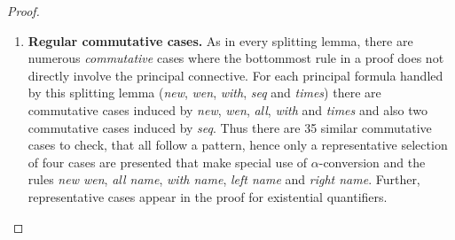 \begin{proof}
\begin{enumerate}[label=\textbf{\Alph*},ref=\Alph*,leftmargin=*]
{Consider the first commutative case for \textit{new} induced by equivariance, where the bottommost rule is of the form
$
\infer[]{
\new x. \new y. P \cpar \wen y. Q \cpar R
}{
\mathopen{\new y.} \left( \new x. P \cpar Q\right) \cpar R
}
$,
where $\vdash \mathopen{\new y.} \left( \new x. P \cpar Q\right) \cpar R$.
By the induction hypothesis, there exist $S$ and $T$ such that $\nfv{y}{S}$ and $\vdash \wen x. P \cpar Q \cpar T$ and either $S = T$ or $S = \wen y .T$, where
$\infer[]{R}{S}$.
Furthermore, the size of the proof of $\wen x. P \cpar Q \cpar T$ is bound above by the size of the proof of $\mathopen{\new y.} \left( \new x. P \cpar Q\right) \cpar R$, hence strictly bound above by the size of the proof of $\new x. \new y. P \cpar \wen y. Q \cpar R$.
Hence, by induction again, there exist $U$ and $V$ such that $\nfv{x}{U}$ and $\vdash P \cpar V$ and either $U = V$ or $U = \wen x. V$, and also $\infer[]{Q \cpar T}{U}$.
If $U = V$ then let $W = \wen y. V$, and if $U = \wen x. V$ then let $W = \wen x. \wen y. V$. 
Also, regardless of whether $S = T$ or $S = \wen y. T$, $\infer[]{\wen y. Q \cpar S}{\mathopen{\wen y.} \left( Q \cpar S \right)}$. Hence derivation $
\infer[]{
\wen y. Q \cpar R
}{
\infer[]{
\wen y. Q \cpar S
}{
\infer[]{
\mathopen{\wen y.} \left( Q \cpar T \right)
}{
\wen y. U
}}}$ can be constructed, where the premise is equivalent to $W$.
Furthermore, $
\infer[]{
\new y. P \cpar \wen y. V
}{
\infer[]{
\mathopen{\new y.} \left( P \cpar V \right)
}{
\infer[]{
\new y. \cunit 
}{ \cunit
}}}$,
and $\size{ \new y. P \cpar \wen y. V } \prec \size{ \new x. \new y. P \cpar \wen y. Q \cpar R }$,
since by Lemma~\ref{lemma:bound} $\size{ \wen y. V } \preceq \size{ \wen y. Q \cpar R }$.

}




 


\item \textbf{Regular commutative cases.} As in every splitting lemma, there are numerous \textit{commutative} cases where the bottommost rule in a proof does not directly involve the principal connective.
For each principal formula handled by this splitting lemma (\textit{new}, \textit{wen}, \textit{with}, \textit{seq} and \textit{times}) there are commutative cases induced by \textit{new}, \textit{wen}, \textit{all}, \textit{with} and \textit{times} and also two commutative cases induced by \textit{seq}.
Thus there are 35 similar commutative cases to check, that all follow a pattern, hence only a representative selection of four cases are presented that make special use of $\alpha$-conversion and the rules \textit{new wen},
\textit{all name}, \textit{with name}, \textit{left name} and \textit{right name}.
Further, representative cases appear in the proof for existential quantifiers.



\end{enumerate}
\end{proof}

